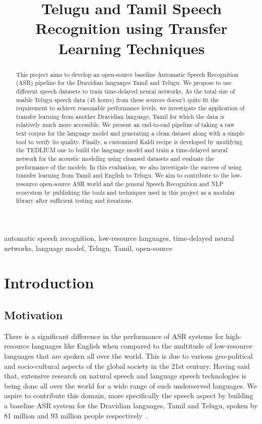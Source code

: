\documentclass[11pt]{article} \usepackage{spconf,amsmath,graphicx}
\title{Telugu and Tamil Speech Recognition using Transfer Learning Techniques}
\begin{document}
%
\maketitle
%
\begin{abstract} This project aims to develop an open-source baseline Automatic
Speech Recognition (ASR) pipeline for the Dravidian languages Tamil
and Telugu. We propose to use different speech datasets to train time-delayed
neural networks. As the total size of usable Telugu speech data (45 hours) from
these sources doesn't quite fit the requirement to achieve reasonable
performance levels, we investigate the application of transfer learning from
another Dravidian language, Tamil for which the data is relatively much more accessible. 
We present an end-to-end pipeline of taking a raw text corpus for the language model and
generating a clean dataset along with a simple tool to verify its quality.
Finally, a customized Kaldi recipe is developed by modifying the TEDLIUM one
to build the language model and train a time-delayed neural network for the acoustic modeling
using cleansed datasets and evaluate the performance of the models. In this evaluation, we also investigate the success of
using transfer learning from Tamil and English to Telugu. We aim to contribute to the low-resource open-source
ASR world and the general Speech Recognition and NLP ecosystem by publishing the
tools and techniques used in this project as a modular library after sufficient
testing and iterations.

\end{abstract}
%
\begin{keywords} automatic speech recognition, low-resource languages,
time-delayed neural networks, language model, Telugu, Tamil, open-source

\end{keywords}
%
\section{Introduction} \label{sec:intro}

\subsection{Motivation} There is a significant difference in the performance of ASR
systems for high-resource languages like English when compared to the multitude of
low-resource languages that are spoken all over the world. This is due to
various geo-political and socio-cultural aspects of the global society in the
21st century. Having said that, extensive research on natural speech and
language speech technologies is being done all over the world for a wide range
of such underserved languages. We aspire to contribute this domain, more
specifically the speech aspect by building a baseline ASR system for the
Dravidian languages, Tamil and Telugu, spoken by 81 million and 93 million
people respectively~\cite{numspeaker}.
\end{document}
